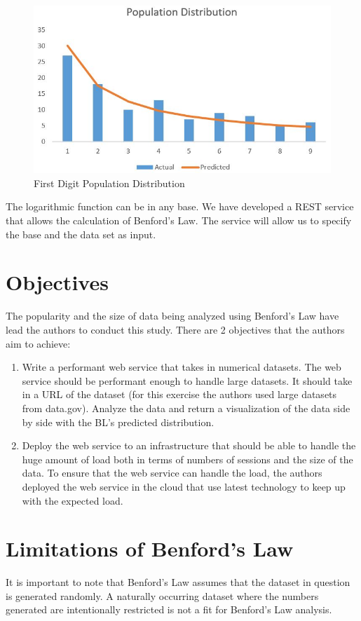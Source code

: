\begin{figure}[!ht]
\centering\includegraphics[width=\columnwidth]{images/benford_country.JPG}
  \caption{First Digit Population Distribution}\label{f:pop-dist-countries}
\end{figure}

The logarithmic function can be in any base. 
We have developed a REST service that allows
the calculation of Benford's Law. 
The service will allow us to specify 
the base and the data set as input. 

\section{Objectives}
The popularity and the size of data being 
analyzed using Benford’s Law have lead the authors 
to conduct this study. 
There are 2 objectives that the authors aim to achieve:

\begin{enumerate}
\item
Write a performant web service that takes in numerical datasets. 
The web service should be performant enough to handle large datasets. 
It should take in a URL of the dataset (for this exercise the authors used
large datasets from data.gov). Analyze the data and return a visualization 
of the data side by side with the BL’s predicted distribution.
\item
Deploy the web service to an infrastructure that should be able to handle 
the huge amount of load both in terms of numbers of sessions and the size 
of the data. To ensure that the web service can handle the load, 
the authors deployed the web service in the cloud that use latest 
technology to keep up with the expected load.
\end{enumerate}

\section{Limitations of Benford’s Law}
It is important to note that Benford’s Law assumes that the 
dataset in question is generated randomly. A naturally occurring 
dataset where the numbers generated are intentionally restricted 
is not a fit for Benford’s Law analysis. 

